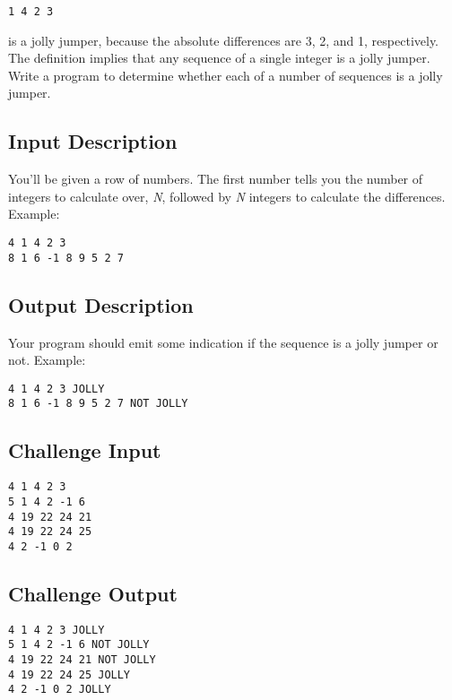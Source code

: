 \begin{lstlisting}
1 4 2 3
\end{lstlisting}

is a jolly jumper, because the absolute differences are 3, 2, and 1,
respectively. The definition implies that any sequence of a single
integer is a jolly jumper. Write a program to determine whether each of
a number of sequences is a jolly jumper.

\subsection*{Input Description}\label{input-description-21}

You'll be given a row of numbers. The first number tells you the number
of integers to calculate over, \emph{N}, followed by \emph{N} integers
to calculate the differences. Example:

\begin{lstlisting}
4 1 4 2 3
8 1 6 -1 8 9 5 2 7
\end{lstlisting}

\subsection*{Output Description}\label{output-description-22}

Your program should emit some indication if the sequence is a jolly
jumper or not. Example:

\begin{lstlisting}
4 1 4 2 3 JOLLY
8 1 6 -1 8 9 5 2 7 NOT JOLLY
\end{lstlisting}

\subsection*{Challenge Input}\label{challenge-input-23}

\begin{lstlisting}
4 1 4 2 3
5 1 4 2 -1 6
4 19 22 24 21
4 19 22 24 25
4 2 -1 0 2
\end{lstlisting}

\subsection*{Challenge Output}\label{challenge-output-20}

\begin{lstlisting}
4 1 4 2 3 JOLLY
5 1 4 2 -1 6 NOT JOLLY
4 19 22 24 21 NOT JOLLY
4 19 22 24 25 JOLLY
4 2 -1 0 2 JOLLY
\end{lstlisting}


